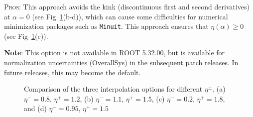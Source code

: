 \textsc{Pros:} This approach avoids the kink (discontinuous first and second derivatives) at $\alpha=0$ (see Fig~\ref{fig:interp1d}(b-d)), which can cause some difficulties for numerical minimization packages such as \texttt{Minuit}.  This approach ensures that $\eta(\alpha)\ge 0$ (see Fig~\ref{fig:interp1d}(c)). 


\textbf{Note}: This option is not available in ROOT 5.32.00, but is available for normalization uncertainties (OverallSys) in the subsequent patch releases.  In future releases, this may become the default.


\begin{figure}[h]
\begin{center}
\caption{Comparison of the three interpolation options for different $\eta^\pm$.  (a) $\eta^-=0.8$, $\eta^+=1.2$, (b) $\eta^-=1.1$, $\eta^+=1.5$, (c) $\eta^-=0.2$, $\eta^+=1.8$, and (d) $\eta^-=0.95$, $\eta^+=1.5$}
\label{fig:interp1d}
\end{center}
\end{figure}

